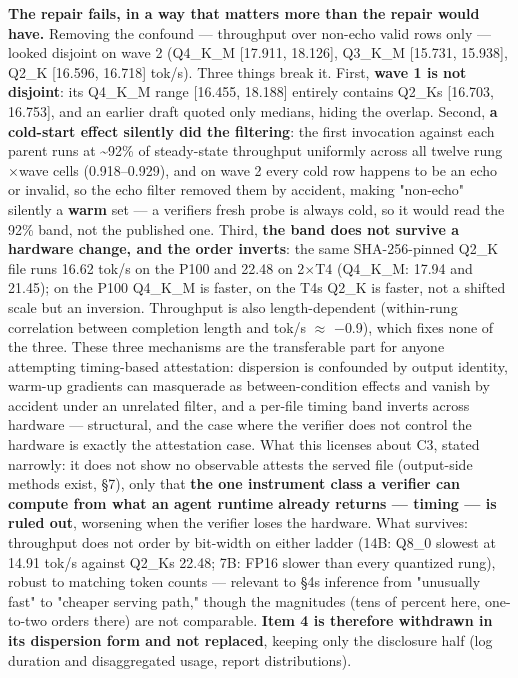 \begin{enumerate}
  \textbf{The repair fails, in a way that matters more than the repair would have.} Removing the confound --- throughput over non-echo valid rows only --- looked disjoint on wave 2 (Q4\_K\_M {[}17.911, 18.126{]}, Q3\_K\_M {[}15.731, 15.938{]}, Q2\_K {[}16.596, 16.718{]} tok/s). Three things break it. First, \textbf{wave 1 is not disjoint}: its Q4\_K\_M range {[}16.455, 18.188{]} entirely contains Q2\_K\textquotesingle s {[}16.703, 16.753{]}, and an earlier draft quoted only medians, hiding the overlap. Second, \textbf{a cold-start effect silently did the filtering}: the first invocation against each parent runs at \textasciitilde92\% of steady-state throughput uniformly across all twelve rung\(\times\)wave cells (0.918--0.929), and on wave 2 every cold row happens to be an echo or invalid, so the echo filter removed them by accident, making "non-echo" silently a \textbf{warm} set --- a verifier\textquotesingle s fresh probe is always cold, so it would read the 92\% band, not the published one. Third, \textbf{the band does not survive a hardware change, and the order inverts}: the same SHA-256-pinned Q2\_K file runs 16.62 tok/s on the P100 and 22.48 on 2\(\times\)T4 (Q4\_K\_M: 17.94 and 21.45); on the P100 Q4\_K\_M is faster, on the T4s Q2\_K is faster, not a shifted scale but an inversion. Throughput is also length-dependent (within-rung correlation between completion length and tok/s \(\approx\) \(-\)0.9), which fixes none of the three. These three mechanisms are the transferable part for anyone attempting timing-based attestation: dispersion is confounded by output identity, warm-up gradients can masquerade as between-condition effects and vanish by accident under an unrelated filter, and a per-file timing band inverts across hardware --- structural, and the case where the verifier does not control the hardware is exactly the attestation case. What this licenses about C3, stated narrowly: it does not show no observable attests the served file (output-side methods exist, §7), only that \textbf{the one instrument class a verifier can compute from what an agent runtime already returns --- timing --- is ruled out}, worsening when the verifier loses the hardware. What survives: throughput does not order by bit-width on either ladder (14B: Q8\_0 slowest at 14.91 tok/s against Q2\_K\textquotesingle s 22.48; 7B: FP16 slower than every quantized rung), robust to matching token counts --- relevant to §4\textquotesingle s inference from "unusually fast" to "cheaper serving path," though the magnitudes (tens of percent here, one-to-two orders there) are not comparable. \textbf{Item 4 is therefore withdrawn in its dispersion form and not replaced}, keeping only the disclosure half (log duration and disaggregated usage, report distributions).

\end{enumerate}
